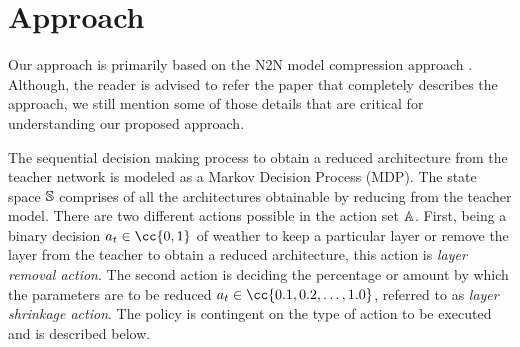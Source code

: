 \documentclass[../main]{subfiles}
\begin{document}
\section{Approach}
    \label{sec:approach}
    Our approach is primarily based on the N2N model compression approach \cite{ashok2017n2n}.
    Although, the reader is advised to refer the paper that completely describes the approach, we still mention some of those details that are critical for understanding our proposed approach. 
    
    The sequential decision making process to obtain a reduced architecture from the teacher network is modeled as a Markov Decision Process (MDP).
    The state space $\mathbb{S}$ comprises of all the architectures obtainable by reducing from the teacher model.
    There are two different actions possible in the action set $\mathbb{A}$.
    First, being a binary decision $a_{t} \in \cc{0,1}$ of weather to keep a particular layer or remove the layer from the teacher to obtain a reduced architecture, this action is \textit{layer removal action}.
    The second action is deciding the percentage or amount by which the parameters are to be reduced $a_{t} \in \cc{0.1, 0.2, \dotsc, 1.0}$, referred to as \textit{layer shrinkage action}.
    The policy is contingent on the type of action to be executed and is described below.
\end{document}
